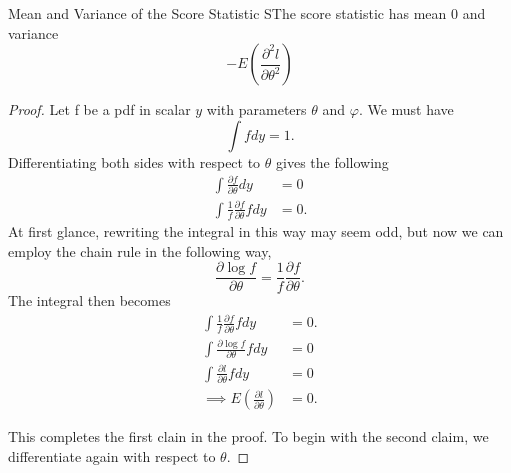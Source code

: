 \begin{theorem}{Mean and Variance of the Score Statistic}
   SThe score statistic has mean $0$ and variance 
   \[
     -E\left(\frac{\partial^2l}{\partial\theta^2}\right)
   \] 
\end{theorem}
\begin{proof}
    Let f be a pdf in scalar $y$ with parameters $\theta$ and $\varphi$. We must have 
    \[
        \int f dy = 1.
    \]
    Differentiating both sides with respect to $\theta$ gives the following
    \begin{align*}
        \int \frac{\partial f}{\partial \theta}dy &= 0 \\
        \int \frac{1}{f}\frac{\partial f}{\partial \theta}f dy &= 0.
    \end{align*}
    At first glance, rewriting the integral in this way may seem odd, but now we can employ the chain rule in the following way,
    \[
        \frac{\partial \log f}{\partial \theta} = \frac{1}{f}\frac{\partial f}{\partial \theta}.  
    \] 
    The integral then becomes
    \begin{align*}
        \int \frac{1}{f}\frac{\partial f}{\partial \theta}f dy &= 0. \\
        \int \frac{\partial \log f}{\partial \theta}f dy &= 0 \\
        \int \frac{\partial l}{\partial \theta}fdy &= 0 \\
        \implies E\left(\frac{\partial l }{\partial \theta}\right) &= 0.
    \end{align*}

    This completes the first clain in the proof. To begin with the second claim, we differentiate again with respect to $\theta$.


\end{proof}
